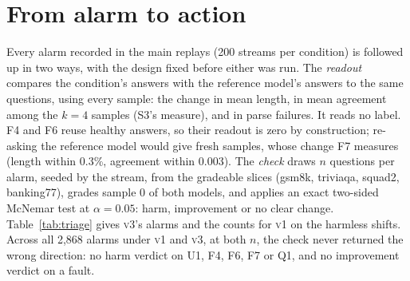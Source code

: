 \documentclass{article}
\newcommand{\vone}{\textsc{v1}}
\newcommand{\vthree}{\textsc{v3}}
\begin{document}
\section{From alarm to action}
\label{app:triage}
Every alarm recorded in the main replays (200 streams per condition) is followed
up in two ways, with the design fixed before either was run. The \emph{readout}
compares the condition's answers with the reference model's answers to the same
questions, using every sample: the change in mean length, in mean agreement among
the $k=4$ samples (S3's measure), and in parse failures. It reads no label. F4 and
F6 reuse healthy answers, so their readout is zero by construction; re-asking the
reference model would give fresh samples, whose change F7 measures (length within
0.3\%, agreement within 0.003). The \emph{check} draws $n$ questions per alarm,
seeded by the stream, from the gradeable slices (\textsf{gsm8k}, \textsf{triviaqa},
\textsf{squad2}, \textsf{banking77}), grades sample 0 of both models, and applies
an exact two-sided McNemar test at $\alpha=0.05$: harm, improvement or no clear
change. Table~\ref{tab:triage} gives \vthree{}'s alarms and the counts for
\vone{} on the harmless shifts. Across all 2{,}868 alarms under \vone{} and \vthree{}, at
both $n$, the check never returned the wrong direction: no harm verdict on U1, F4, F6, F7 or Q1, and no
improvement verdict on a fault.
\end{document}
